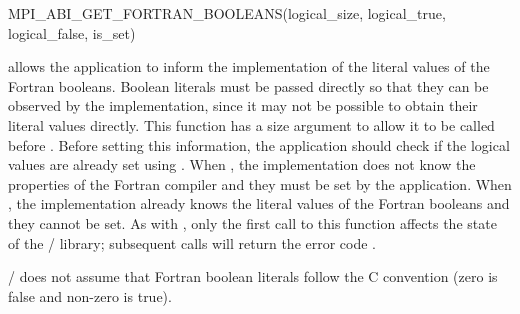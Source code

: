 \begin{funcdef}{MPI\_ABI\_GET\_FORTRAN\_BOOLEANS}{(\mbox{logical\_size}, \mbox{logical\_true}, \mbox{logical\_false}, \mbox{is\_set})}
\end{funcdef}

 allows the application
to inform the implementation of the literal values of the Fortran booleans.
Boolean literals must be passed directly so that they can be observed
by the implementation, since it may not be possible to obtain their
literal values directly.
This function has a size argument to allow it to be called before
.
Before setting this information, the application should
check if the logical values are already set
using .
When , the implementation
does not know the properties of the Fortran compiler and they
must be set by the application.
When , the implementation
already knows the literal values of the Fortran booleans
and they cannot be set.
As with , only the first call
to this function affects the state of the \MPI/ library; subsequent
calls will return the error code .

\begin{rationale}
\MPI/ does not assume that Fortran boolean literals follow the C
convention (zero is false and non-zero is true).
\end{rationale}

